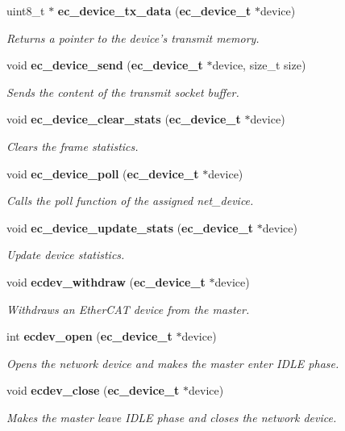 \begin{DoxyCompactItemize}
uint8\-\_\-t $\ast$ {\bf ec\-\_\-device\-\_\-tx\-\_\-data} ({\bf ec\-\_\-device\-\_\-t} $\ast$device)
\begin{DoxyCompactList}\small\item\em Returns a pointer to the device's transmit memory. \end{DoxyCompactList}\item 
void {\bf ec\-\_\-device\-\_\-send} ({\bf ec\-\_\-device\-\_\-t} $\ast$device, size\-\_\-t size)
\begin{DoxyCompactList}\small\item\em Sends the content of the transmit socket buffer. \end{DoxyCompactList}\item 
void {\bf ec\-\_\-device\-\_\-clear\-\_\-stats} ({\bf ec\-\_\-device\-\_\-t} $\ast$device)
\begin{DoxyCompactList}\small\item\em Clears the frame statistics. \end{DoxyCompactList}\item 
void {\bf ec\-\_\-device\-\_\-poll} ({\bf ec\-\_\-device\-\_\-t} $\ast$device)
\begin{DoxyCompactList}\small\item\em Calls the poll function of the assigned net\-\_\-device. \end{DoxyCompactList}\item 
void {\bf ec\-\_\-device\-\_\-update\-\_\-stats} ({\bf ec\-\_\-device\-\_\-t} $\ast$device)
\begin{DoxyCompactList}\small\item\em Update device statistics. \end{DoxyCompactList}\item 
void {\bf ecdev\-\_\-withdraw} ({\bf ec\-\_\-device\-\_\-t} $\ast$device)
\begin{DoxyCompactList}\small\item\em Withdraws an Ether\-C\-A\-T device from the master. \end{DoxyCompactList}\item 
int {\bf ecdev\-\_\-open} ({\bf ec\-\_\-device\-\_\-t} $\ast$device)
\begin{DoxyCompactList}\small\item\em Opens the network device and makes the master enter I\-D\-L\-E phase. \end{DoxyCompactList}\item 
void {\bf ecdev\-\_\-close} ({\bf ec\-\_\-device\-\_\-t} $\ast$device)
\begin{DoxyCompactList}\small\item\em Makes the master leave I\-D\-L\-E phase and closes the network device. \end{DoxyCompactList}\item 

\end{DoxyCompactItemize}
